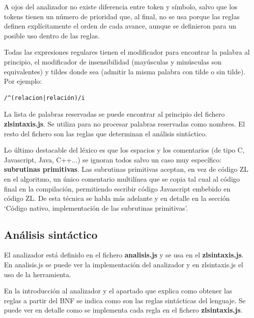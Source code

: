 \documentclass{report}
\begin{document}
	A ojos del analizador no existe diferencia entre token y símbolo, salvo que los tokens tienen un número de prioridad que, al final, no se usa porque las reglas definen explícitamente el orden de cada avance, aunque se definieron para un posible uso dentro de las reglas. 

	\vspace{10px}
	
	Todas las expresiones regulares tienen el modificador para encontrar la palabra al principio, el modificador de insensibilidad (mayúsculas y minúsculas son equivalentes) y tildes donde sea (admitir la misma palabra con tilde o sin tilde). Por ejemplo: 
	
	\begin{BVerbatim}
/^(relacion|relación)/i
	\end{BVerbatim}

	\vspace{10px}
	
	La lista de palabras reservadas se puede encontrar al principio del fichero \textbf{zlsintaxis.js}. Se utiliza para no procesar palabras reservadas como nombres. El resto del fichero son las reglas que determinan el análisis sintáctico.
	
	\vspace{10px}
	
	Lo último destacable del léxico es que los espacios y los comentarios (de tipo C, Javascript, Java, C++...) se ignoran todos salvo un caso muy específico: \textbf{subrutinas primitivas}. Las subrutinas primitivas aceptan, en vez de código ZL en el algoritmo, un único comentario multilínea que se copia tal cual al código final en la compilación, permitiendo escribir código Javascript embebido en código ZL. De esta técnica se habla más adelante y en detalle en la sección `Código nativo, implementación de las subrutinas primitivas'.
	
	\subsection{Análisis sintáctico}
	
	El analizador está definido en el fichero \textbf{analisis.js} y se usa en el \textbf{zlsintaxis.js}. En analisis.js se puede ver la implementación del analizador y en zlsintaxis.js el uso de la herramienta.
	
	\vspace{10px}
	
	En la introducción al analizador y el apartado que explica como obtener las reglas a partir del BNF se indica como son las reglas sintácticas del lenguaje. Se puede ver en detalle como se implementa cada regla en el fichero \textbf{zlsintaxis.js}.
	
\end{document}
